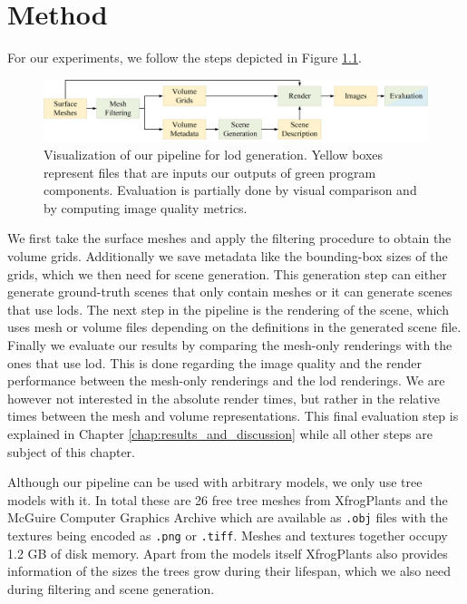 \chapter{Method}
\label{chap:method}
For our experiments, we follow the steps depicted in Figure \ref{fig:pipeline}.
\begin{figure}[ht]
    \centering
    \includegraphics[width=1.0\linewidth]{img/pipeline.png}
    \caption[Visualization of the pipeline the thesis built upon]{Visualization of our pipeline for \ac{lod} generation. Yellow boxes represent files that are inputs our outputs of green program components. Evaluation is partially done by visual comparison and by computing image quality metrics.}
    \label{fig:pipeline}
\end{figure}
We first take the surface meshes and apply the filtering procedure to obtain the volume grids.
Additionally we save metadata like the bounding-box sizes of the grids, which we then need for scene generation.
This generation step can either generate ground-truth scenes that only contain meshes or it can generate scenes that use \acp{lod}.
The next step in the pipeline is the rendering of the scene, which uses mesh or volume files depending on the definitions in the generated scene file.
Finally we evaluate our results by comparing the mesh-only renderings with the ones that use \ac{lod}.
This is done regarding the image quality and the render performance between the mesh-only renderings and the \ac{lod} renderings.
We are however not interested in the absolute render times, but rather in the relative times between the mesh and volume representations.
This final evaluation step is explained in Chapter \ref{chap:results_and_discussion} while all other steps are subject of this chapter.

Although our pipeline can be used with arbitrary models, we only use tree models with it.
In total these are 26 free tree meshes from XfrogPlants \cite{xfrogplants} and the McGuire Computer Graphics Archive \cite{McGuire2017Data} which are available as \texttt{.obj} files with the textures being encoded as \texttt{.png} or \texttt{.tiff}.
Meshes and textures together occupy 1.2 GB of disk memory.
Apart from the models itself XfrogPlants also provides information of the sizes the trees grow during their lifespan, which we also need during filtering and scene generation.

